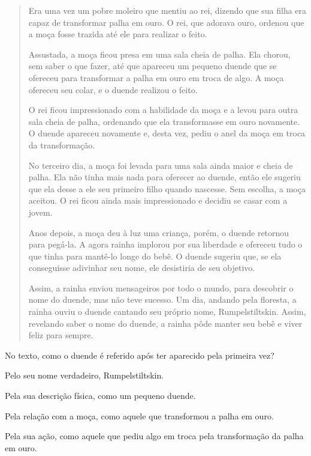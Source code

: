 \begin{quote}
Era uma vez um pobre moleiro que mentiu ao rei, dizendo que sua filha
era capaz de transformar palha em ouro. O rei, que adorava ouro, ordenou
que a moça fosse trazida até ele para realizar o feito.

Assustada, a moça ficou presa em uma sala cheia de palha. Ela chorou,
sem saber o que fazer, até que apareceu um pequeno duende que se
ofereceu para transformar a palha em ouro em troca de algo. A moça
ofereceu seu colar, e o duende realizou o feito.

O rei ficou impressionado com a habilidade da moça e a levou para outra
sala cheia de palha, ordenando que ela transformasse em ouro novamente.
O duende apareceu novamente e, desta vez, pediu o anel da moça em troca
da transformação.

No terceiro dia, a moça foi levada para uma sala ainda maior e cheia de
palha. Ela não tinha mais nada para oferecer ao duende, então ele
sugeriu que ela desse a ele seu primeiro filho quando nascesse. Sem
escolha, a moça aceitou. O rei ficou ainda mais impressionado e decidiu
se casar com a jovem.

Anos depois, a moça deu à luz uma criança, porém, o duende retornou para
pegá-la. A agora rainha implorou por sua liberdade e ofereceu tudo o que
tinha para mantê-lo longe do bebê. O duende sugeriu que, se ela
conseguisse adivinhar seu nome, ele desistiria de seu objetivo.

Assim, a rainha enviou mensageiros por todo o mundo, para descobrir o
nome do duende, mas não teve sucesso. Um dia, andando pela floresta, a
rainha ouviu o duende cantando seu próprio nome, Rumpelstiltskin. Assim,
revelando saber o nome do duende, a rainha pôde manter seu bebê e viver
feliz para sempre.
\end{quote}

No texto, como o duende é referido após ter aparecido pela primeira vez?

\begin{escolha}
\item Pelo seu nome verdadeiro, Rumpelstiltskin.

\item Pela sua descrição física, como um pequeno duende.

\item Pela relação com a moça, como aquele que transformou a palha em ouro.

\item Pela sua ação, como aquele que pediu algo em troca pela transformação da palha em ouro.
\end{escolha}

